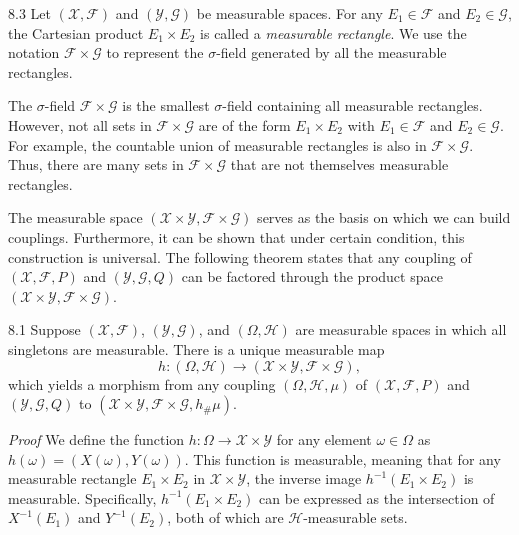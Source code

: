 \begin{defbox}{8.3}
Let $(\mathcal{X},\mathcal{F})$ and $(\mathcal{Y},\mathcal{G})$ be measurable spaces. For any $E_1\in \mathcal{F}$ and $E_2\in \mathcal{G}$, the Cartesian product $E_1\times E_2$ is called a \textit{measurable rectangle}. We use the notation $\mathcal{F}\times \mathcal{G}$ to represent the $\sigma$-field generated by all the measurable rectangles.

The $\sigma$-field $\mathcal{F}\times \mathcal{G}$ is the smallest $\sigma$-field containing all measurable rectangles. However, not all sets in $\mathcal{F}\times \mathcal{G}$ are of the form $E_1\times E_2$ with $E_1\in \mathcal{F}$ and $E_2\in \mathcal{G}$. For example, the countable union of measurable rectangles is also in $\mathcal{F}\times \mathcal{G}$. Thus, there are many sets in $\mathcal{F}\times \mathcal{G}$ that are not themselves measurable rectangles.
\end{defbox}

The measurable space $(\mathcal{X}\times \mathcal{Y},\mathcal{F}\times \mathcal{G})$ serves as the basis on which we can build couplings. Furthermore, it can be shown that under certain condition, this construction is universal. The following theorem states that any coupling of $(\mathcal{X},\mathcal{F},P)$ and $(\mathcal{Y},\mathcal{G},Q)$ can be factored through the product space $(\mathcal{X}\times \mathcal{Y},\mathcal{F}\times \mathcal{G})$.

\begin{thmbox}{8.1}
Suppose $(\mathcal{X},\mathcal{F})$, $(\mathcal{Y},\mathcal{G})$, and $(\Omega,\mathcal{H})$ are measurable spaces in which all singletons are measurable. There is a unique measurable map
\[
h:(\Omega,\mathcal{H})\to (\mathcal{X}\times \mathcal{Y},\mathcal{F}\times \mathcal{G}),
\]
which yields a morphism from any coupling $(\Omega,\mathcal{H},\mu)$ of $(\mathcal{X},\mathcal{F},P)$ and $(\mathcal{Y},\mathcal{G},Q)$ to $(\mathcal{X}\times \mathcal{Y},\mathcal{F}\times \mathcal{G},h_{\#}\mu)$.
\end{thmbox}

\textit{Proof} We define the function $h:\Omega\to \mathcal{X}\times \mathcal{Y}$ for any element $\omega\in \Omega$ as $h(\omega)=(X(\omega),Y(\omega))$. This function is measurable, meaning that for any measurable rectangle $E_1\times E_2$ in $\mathcal{X}\times \mathcal{Y}$, the inverse image $h^{-1}(E_1\times E_2)$ is measurable. Specifically, $h^{-1}(E_1\times E_2)$ can be expressed as the intersection of $X^{-1}(E_1)$ and $Y^{-1}(E_2)$, both of which are $\mathcal{H}$-measurable sets.

